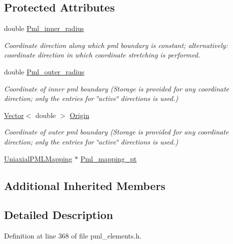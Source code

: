 \subsection*{Protected Attributes}
\begin{DoxyCompactItemize}
\item 
double \hyperlink{classoomph_1_1AnnularFromCartesianPMLElement_ab456fc3ba012d0fe871df2f580298a52}{Pml\+\_\+inner\+\_\+radius}
\begin{DoxyCompactList}\small\item\em Coordinate direction along which pml boundary is constant; alternatively\+: coordinate direction in which coordinate stretching is performed. \end{DoxyCompactList}\item 
double \hyperlink{classoomph_1_1AnnularFromCartesianPMLElement_a2dd7b0074775618fcb2e1072fd81d10a}{Pml\+\_\+outer\+\_\+radius}
\begin{DoxyCompactList}\small\item\em Coordinate of inner pml boundary (Storage is provided for any coordinate direction; only the entries for \char`\"{}active\char`\"{} directions is used.) \end{DoxyCompactList}\item 
\hyperlink{classoomph_1_1Vector}{Vector}$<$ double $>$ \hyperlink{classoomph_1_1AnnularFromCartesianPMLElement_aa31e399eca5049053bce373144a52de0}{Origin}
\begin{DoxyCompactList}\small\item\em Coordinate of outer pml boundary (Storage is provided for any coordinate direction; only the entries for \char`\"{}active\char`\"{} directions is used.) \end{DoxyCompactList}\item 
\hyperlink{classoomph_1_1UniaxialPMLMapping}{Uniaxial\+P\+M\+L\+Mapping} $\ast$ \hyperlink{classoomph_1_1AnnularFromCartesianPMLElement_aae716d46c00db3cec8b6cf2816440f55}{Pml\+\_\+mapping\+\_\+pt}
\end{DoxyCompactItemize}
\subsection*{Additional Inherited Members}


\subsection{Detailed Description}


Definition at line 368 of file pml\+\_\+elements.\+h.



